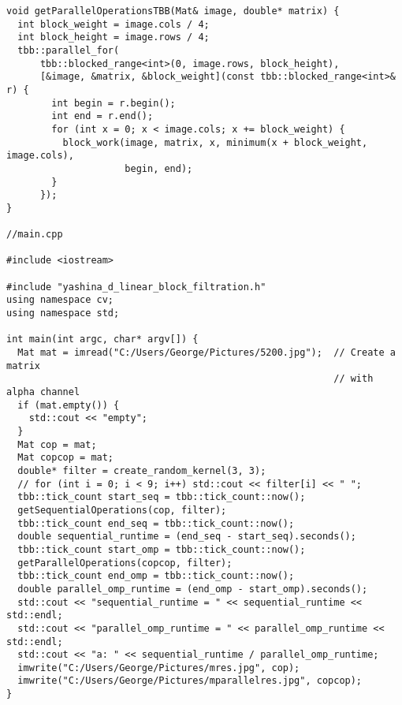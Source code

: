 \documentclass{report}
\begin{document}
\begin{lstlisting}
void getParallelOperationsTBB(Mat& image, double* matrix) {
  int block_weight = image.cols / 4;
  int block_height = image.rows / 4;
  tbb::parallel_for(
      tbb::blocked_range<int>(0, image.rows, block_height),
      [&image, &matrix, &block_weight](const tbb::blocked_range<int>& r) {
        int begin = r.begin();
        int end = r.end();
        for (int x = 0; x < image.cols; x += block_weight) {
          block_work(image, matrix, x, minimum(x + block_weight, image.cols),
                     begin, end);
        }
      });
}

//main.cpp

#include <iostream>

#include "yashina_d_linear_block_filtration.h"
using namespace cv;
using namespace std;

int main(int argc, char* argv[]) {
  Mat mat = imread("C:/Users/George/Pictures/5200.jpg");  // Create a matrix
                                                          // with alpha channel
  if (mat.empty()) {
    std::cout << "empty";
  }
  Mat cop = mat;
  Mat copcop = mat;
  double* filter = create_random_kernel(3, 3);
  // for (int i = 0; i < 9; i++) std::cout << filter[i] << " ";
  tbb::tick_count start_seq = tbb::tick_count::now();
  getSequentialOperations(cop, filter);
  tbb::tick_count end_seq = tbb::tick_count::now();
  double sequential_runtime = (end_seq - start_seq).seconds();
  tbb::tick_count start_omp = tbb::tick_count::now();
  getParallelOperations(copcop, filter);
  tbb::tick_count end_omp = tbb::tick_count::now();
  double parallel_omp_runtime = (end_omp - start_omp).seconds();
  std::cout << "sequential_runtime = " << sequential_runtime << std::endl;
  std::cout << "parallel_omp_runtime = " << parallel_omp_runtime << std::endl;
  std::cout << "a: " << sequential_runtime / parallel_omp_runtime;
  imwrite("C:/Users/George/Pictures/mres.jpg", cop);
  imwrite("C:/Users/George/Pictures/mparallelres.jpg", copcop);
}

\end{lstlisting}
\end{document}
